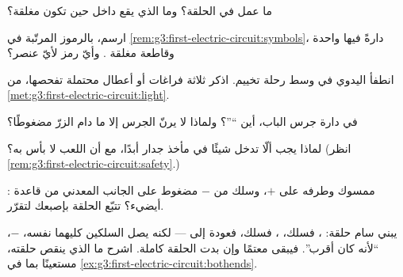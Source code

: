\begin{exercise}[$\star$]\label{exo:g3:first-electric-circuit:4}
ما عمل  في الحلقة؟ وما الذي يقع داخل  حين تكون
مغلقة؟
\end{exercise}

\begin{exercise}[$\star$]\label{exo:g3:first-electric-circuit:5}
ارسم، بالرموز المرتّبة في
\cref{rem:g3:first-electric-circuit:symbols}، دارةً فيها 
واحدة وقاطعة مغلقة . وأيّ رمز لأيّ عنصر؟
\end{exercise}

\begin{exercise}[$\star$]\label{exo:g3:first-electric-circuit:6}
انطفأ  اليدوي في وسط رحلة تخييم. اذكر ثلاثة فراغات أو
أعطال محتملة تفحصها، من
\cref{met:g3:first-electric-circuit:light}.
\end{exercise}

\begin{exercise}[$\star$]\label{exo:g3:first-electric-circuit:7}
في دارة جرس الباب، أين ``''؟ ولماذا لا يرنّ الجرس إلا ما
دام الزرّ مضغوطًا؟
\end{exercise}

\begin{exercise}[$\star$]\label{exo:g3:first-electric-circuit:8}
لماذا يجب ألّا تدخل شيئًا في مأخذ جدار أبدًا، مع أن اللعب
 لا بأس به؟ (انظر
\cref{rem:g3:first-electric-circuit:safety}.)
\end{exercise}

\begin{exercise}[$\star$]\label{exo:g3:first-electric-circuit:9}
 ممسوك وطرفه على   $+$، وسلك من   $-$
مضغوط على الجانب المعدني من قاعدة : أيضيء؟ تتبّع الحلقة
بإصبعك لتقرّر.
\end{exercise}

\begin{exercise}[$\star\star$]\label{exo:g3:first-electric-circuit:10}
يبني سام حلقة: ، فسلك، ، فسلك، فعودة إلى 
--- لكنه يصل السلكين كليهما  نفسه، $-$، ``لأنه كان
أقرب''. فيبقى  معتمًا وإن بدت الحلقة كاملة. اشرح ما الذي
ينقص حلقته، مستعينًا
بما في \cref{ex:g3:first-electric-circuit:bothends}.
\end{exercise}

